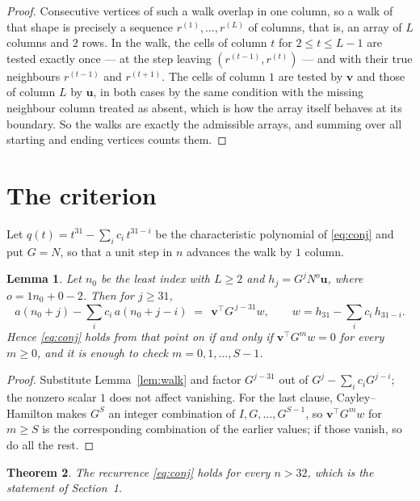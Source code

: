 \documentclass[11pt,a4paper]{article}
\theoremstyle{plain}
\newtheorem{theorem}{Theorem}
\newtheorem{lemma}[theorem]{Lemma}
\theoremstyle{definition}
\begin{document}
\begin{proof}
Consecutive vertices of such a walk overlap in one column, so a walk of that shape is
precisely a sequence $r^{(1)},\dots,r^{(L)}$ of columns, that is, an array of $L$ columns
and $2$ rows. In the walk, the cells of column $t$ for $2\le t\le L-1$ are tested
exactly once --- at the step leaving $(r^{(t-1)},r^{(t)})$ --- and with their true
neighbours $r^{(t-1)}$ and $r^{(t+1)}$. The cells of column $1$ are tested by
$\mathbf{v}$ and those of column $L$ by $\mathbf{u}$, in both cases by the same condition
with the missing neighbour column treated as absent, which is how the array itself behaves at
its boundary. So the walks are exactly the admissible arrays, and summing over all starting
and ending vertices counts them.
\end{proof}

\section{The criterion}

Let $q(t)=t^{31}-\sum_i c_i\,t^{31-i}$ be the characteristic polynomial of
\eqref{eq:conj} and put $G=N$, so that a unit step in $n$ advances the walk by
$1$ column.

\begin{lemma}\label{lem:crit}
Let $n_0$ be the least index with $L\ge2$ and $h_j=G^{j}N^{o}\mathbf{u}$, where
$o=1n_0+0-2$. Then for $j\ge31$,
\[
a(n_0+j)-\sum_i c_i\,a(n_0+j-i)\;=\;\,\mathbf{v}^{\!\top}G^{\,j-31}w,
\qquad w=h_{31}-\sum_i c_i\,h_{31-i} .
\]
Hence \eqref{eq:conj} holds from that point on if and only if
$\mathbf{v}^{\!\top}G^{m}w=0$ for every $m\ge0$, and it is enough to check
$m=0,1,\dots,S-1$.
\end{lemma}

\begin{proof}
Substitute Lemma~\ref{lem:walk} and factor $G^{j-31}$ out of
$G^{j}-\sum_ic_iG^{j-i}$; the nonzero scalar $1$ does not affect
vanishing. For the last clause, Cayley--Hamilton makes $G^{S}$ an integer combination of
$I,G,\dots,G^{S-1}$, so $\mathbf{v}^{\!\top}G^{m}w$ for $m\ge S$ is the corresponding
combination of the earlier values; if those vanish, so do all the rest.
\end{proof}

\begin{theorem}
The recurrence \eqref{eq:conj} holds for every $n>32$, which is the statement of
Section~1.
\end{theorem}
\end{document}
